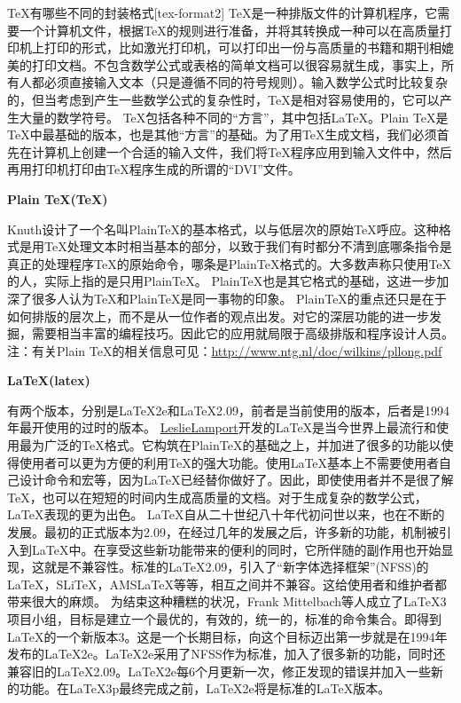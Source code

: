 \begin{faq}{\TeX{}有哪些不同的封装格式}[tex-format2]
  TeX是一种排版文件的计算机程序，它需要一个计算机文件，根据TeX的规则进行准备，并将其转换成一种可以在高质量打印机上打印的形式，比如激光打印机，可以打印出一份与高质量的书籍和期刊相媲美的打印文档。不包含数学公式或表格的简单文档可以很容易就生成，事实上，所有人都必须直接输入文本（只是遵循不同的符号规则）。输入数学公式时比较复杂的，但当考虑到产生一些数学公式的复杂性时，TeX是相对容易使用的，它可以产生大量的数学符号。
  TeX包括各种不同的“方言”，其中包括\LaTeX{}。Plain TeX是TeX中最基础的版本，也是其他“方言”的基础。为了用TeX生成文档，我们必须首先在计算机上创建一个合适的输入文件，我们将TeX程序应用到输入文件中，然后再用打印机打印由TeX程序生成的所谓的“DVI”文件。
  
  \textbf{Plain TeX(\TeX{})}
  
  Knuth设计了一个名叫PlainTeX的基本格式，以与低层次的原始TeX呼应。这种格式是用TeX处理文本时相当基本的部分，以致于我们有时都分不清到底哪条指令是真正的处理程序TeX的原始命令，哪条是PlainTeX格式的。大多数声称只使用TeX的人，实际上指的是只用PlainTeX。
  PlainTeX也是其它格式的基础，这进一步加深了很多人认为TeX和PlainTeX是同一事物的印象。
  PlainTeX的重点还只是在于如何排版的层次上，而不是从一位作者的观点出发。对它的深层功能的进一步发掘，需要相当丰富的编程技巧。因此它的应用就局限于高级排版和程序设计人员。
  注：有关Plain TeX的相关信息可见：\url{http://www.ntg.nl/doc/wilkins/pllong.pdf}
  
  \textbf{\LaTeX{}(latex)}
  
  有两个版本，分别是LaTeX2e和LaTeX2.09，前者是当前使用的版本，后者是1994年最开使用的过时的版本。
  \href{https://baike.sogou.com/lemma/ShowInnerLink.htm?lemmaId=73792246&ss_c=ssc.citiao.link}{LeslieLamport}开发的LaTeX是当今世界上最流行和使用最为广泛的TeX格式。它构筑在PlainTeX的基础之上，并加进了很多的功能以使得使用者可以更为方便的利用TeX的强大功能。使用LaTeX基本上不需要使用者自己设计命令和宏等，因为LaTeX已经替你做好了。因此，即使使用者并不是很了解TeX，也可以在短短的时间内生成高质量的文档。对于生成复杂的数学公式，LaTeX表现的更为出色。
  LaTeX自从二十世纪八十年代初问世以来，也在不断的发展。最初的正式版本为2.09，在经过几年的发展之后，许多新的功能，机制被引入到LaTeX中。在享受这些新功能带来的便利的同时，它所伴随的副作用也开始显现，这就是不兼容性。标准的LaTeX2.09，引入了“新字体选择框架”(NFSS)的LaTeX，SLiTeX，AMSLaTeX等等，相互之间并不兼容。这给使用者和维护者都带来很大的麻烦。
  为结束这种糟糕的状况，Frank Mittelbach等人成立了LaTeX3项目小组，目标是建立一个最优的，有效的，统一的，标准的命令集合。即得到LaTeX的一个新版本3。这是一个长期目标，向这个目标迈出第一步就是在1994年发布的LaTeX2e。LaTeX2e采用了NFSS作为标准，加入了很多新的功能，同时还兼容旧的LaTeX2.09。LaTeX2e每6个月更新一次，修正发现的错误并加入一些新的功能。在LaTeX3p最终完成之前，LaTeX2e将是标准的LaTeX版本。
  

\end{faq}
